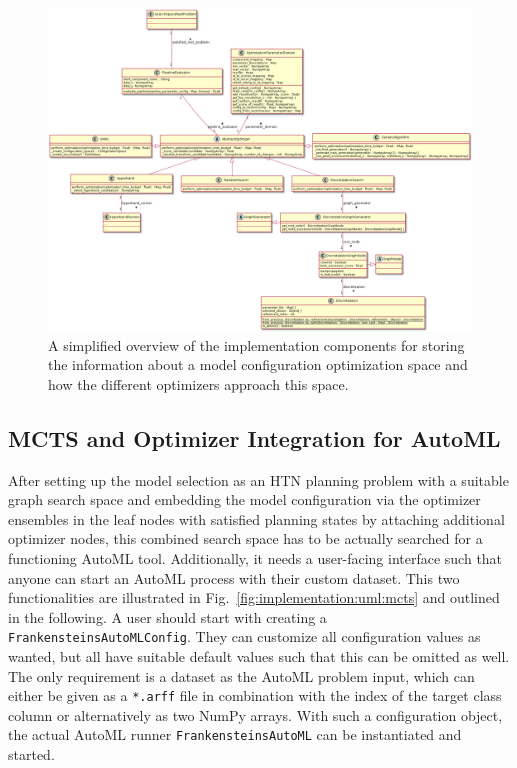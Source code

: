 \begin{figure}[ht!]
    \centering
    \includegraphics[angle=90,origin=c,width=\textwidth,height=0.9\textheight,keepaspectratio]{gfx/Figures/Implementation/optimization/PipelineOptimization.png}
    \caption{A simplified overview of the implementation components for storing the information about a model configuration optimization space and how the different optimizers approach this space.}
    \label{fig:implementation:uml:optimization}
\end{figure}

\subsection{MCTS and Optimizer Integration for AutoML}
\label{sec:implementation:components:mcts}
After setting up the model selection as an HTN planning problem with a suitable graph search space and embedding the model configuration via the optimizer ensembles in the leaf nodes with satisfied planning states by attaching additional optimizer nodes, this combined search space has to be actually searched for a functioning AutoML tool.
Additionally, it needs a user-facing interface such that anyone can start an AutoML process with their custom dataset.
This two functionalities are illustrated in Fig.~\ref{fig:implementation:uml:mcts} and outlined in the following.\newline
A user should start with creating a \texttt{FrankensteinsAutoMLConfig}.
They can customize all configuration values as wanted, but all have suitable default values such that this can be omitted as well.
The only requirement is a dataset as the AutoML problem input, which can either be given as a \texttt{*.arff} file in combination with the index of the target class column or alternatively as two NumPy arrays.
With such a configuration object, the actual AutoML runner \texttt{FrankensteinsAutoML} can be instantiated and started.

